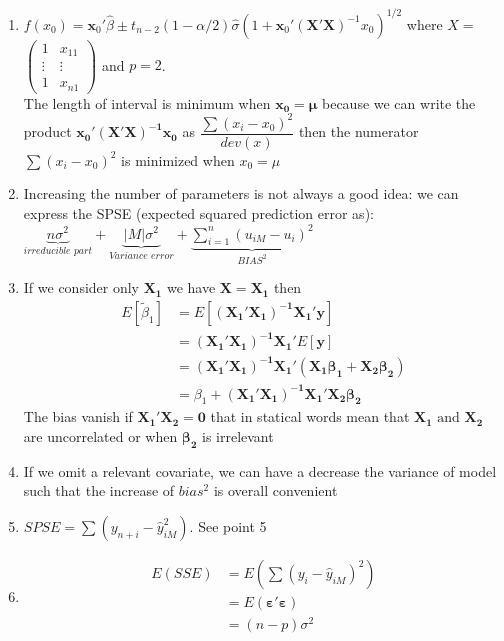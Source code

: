 \documentclass[10pt,a4paper]{article}
\begin{document}
\begin{enumerate}
		\item $ f(x_0) = \mathbf{x}_0' \hat{\beta} \pm t_{n-2}(1-\alpha / 2) \hat{\sigma} (1 + \mathbf{x}_0' (\mathbf{X'X})^{-1} x_0)^{1/2}$
		where $ X = $
		$ \left( \begin{matrix}
			1 & x_{11} \\ 
			\vdots & \vdots  \\ 
		1 & x_{n1}
			\end{matrix} \right)$ and $ p = 2 $.\\
			The length of interval is minimum when $ \mathbf{x_0 = \mu}  $ because we can write the product $ \mathbf{x_0'(X'X)^{-1}x_0}  $ as $ \dfrac{\sum(x_i - x_0)^2}{dev(x)} $ then the numerator $  \sum(x_i - x_0)^2 $ is minimized when $ x_0 = \mu $
			\item Increasing the number of parameters is not always a good idea: we can express the SPSE (expected squared prediction error as):
			$ \underbrace{n\sigma^2}_{irreducible\,\,  part} + \underbrace{|M|\sigma^2}_{Variance \,\, error} + \underbrace{\sum_{i=1}^{n} (u_{i M} - u_i)^2}_{BIAS^2} $
			\item If we consider only $ \mathbf{X_1} $ we have $ \mathbf{X = X_1} $ then 
			\begin{align*}
				E\left[ \tilde{\beta}_1 \right]		&= E \left[ \mathbf{(X_1'X_1)^{-1} X_1'y} \right] \\
				&=  \mathbf{(X_1'X_1)^{-1} X_1' } E \left[ \mathbf{y} \right] \\
				&=  \mathbf{(X_1'X_1)^{-1} X_1' (X_1 \beta_1 + X_2 \beta_2)} \\
				&= \beta_1 +\mathbf{(X_1'X_1)^{-1} X_1'  X_2 \beta_2}
			\end{align*}
			The bias vanish if $ \mathbf{X_1'  X_2  = 0} $ that in statical words mean that $ \mathbf{X_1} \text{ and } \mathbf{X_2} $ are uncorrelated or when $ \mathbf{\beta_2}  $ is irrelevant
			\item If we omit a relevant covariate, we can have a decrease the variance of model such that the increase of $ bias^2 $ is overall convenient
			\item $ SPSE = \sum (y_{n+i} - \hat{y}_{iM}^2) $. See point 5
			\item 
			\begin{align*}
			E\left( SSE \right) &= E\left( \sum \left( y_i - \hat{y}_{iM} \right)^2 \right)  \\
			&= E \left( \mathbf{\varepsilon' \varepsilon} \right) \\
			&= (n-p) \sigma^2 \\

\end{align*}
\end{enumerate}
\end{document}
